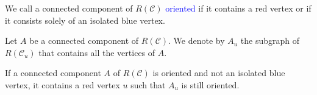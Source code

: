 \documentclass[handout]{beamer}
\theoremstyle{definition}
\def\spadding{\vspace{0.25cm}}
\def\b{\textcolor{blue}}
\begin{document}
\begin{frame}

\begin{definition}
We call a connected component of $R(\mathcal{C})$ \b{oriented} if it contains a red vertex or if it consists solely of an isolated blue vertex. \pause\spadding

Let $A$ be a connected component of $R(\mathcal{C})$. We denote by $A_u$ the subgraph of $R(\mathcal{C}_u)$ that contains all the vertices of $A$.
\end{definition}\pause

\begin{lemma}
\label{lem:4}
If a connected component $A$ of $R(\mathcal{C})$ is oriented and not an isolated blue vertex, it contains a red vertex $u$ such that $A_u$ is still oriented.
\end{lemma}


\end{frame}
\end{document}
